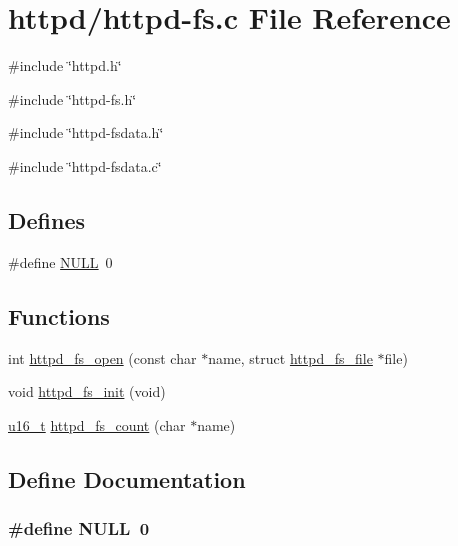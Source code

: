 \hypertarget{httpd-fs_8c}{
\section{httpd/httpd-\/fs.c File Reference}
\label{httpd-fs_8c}
}
{\ttfamily \#include \char`\"{}httpd.h\char`\"{}}\par
{\ttfamily \#include \char`\"{}httpd-\/fs.h\char`\"{}}\par
{\ttfamily \#include \char`\"{}httpd-\/fsdata.h\char`\"{}}\par
{\ttfamily \#include \char`\"{}httpd-\/fsdata.c\char`\"{}}\par
\subsection*{Defines}
\begin{DoxyCompactItemize}
\item 
\#define \hyperlink{httpd-fs_8c_a070d2ce7b6bb7e5c05602aa8c308d0c4}{NULL}~0
\end{DoxyCompactItemize}
\subsection*{Functions}
\begin{DoxyCompactItemize}
\item 
int \hyperlink{httpd-fs_8c_ad5e3d1a458b56855d6a757a3b4b188cd}{httpd\_\-fs\_\-open} (const char $\ast$name, struct \hyperlink{structhttpd__fs__file}{httpd\_\-fs\_\-file} $\ast$file)
\item 
void \hyperlink{httpd-fs_8c_abefee428190eea7014a01b03e64f4c09}{httpd\_\-fs\_\-init} (void)
\item 
\hyperlink{group__uipfw_ga77570ac4fcab86864fa1916e55676da2}{u16\_\-t} \hyperlink{httpd-fs_8c_a87c42bb111e62e0d98cce26d2c2208af}{httpd\_\-fs\_\-count} (char $\ast$name)
\end{DoxyCompactItemize}


\subsection{Define Documentation}
\hypertarget{httpd-fs_8c_a070d2ce7b6bb7e5c05602aa8c308d0c4}{
\subsubsection[{NULL}]{\setlength{\rightskip}{0pt plus 5cm}\#define NULL~0}}
\label{httpd-fs_8c_a070d2ce7b6bb7e5c05602aa8c308d0c4}


